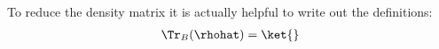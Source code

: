 To reduce the density matrix it is actually helpful to write out the definitions:
\begin{align}
\Tr_B(\rhohat) = \ket{}
\end{align}